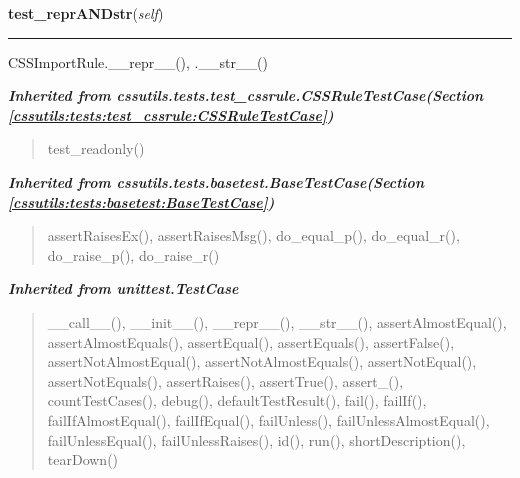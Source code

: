     \label{cssutils:tests:test_cssimportrule:CSSImportRuleTestCase:test_reprANDstr}

    \vspace{0.5ex}

\hspace{.8\funcindent}\begin{boxedminipage}{\funcwidth}

    \raggedright \textbf{test\_reprANDstr}(\textit{self})

    \vspace{-1.5ex}

    \rule{\textwidth}{0.5\fboxrule}
\setlength{\parskip}{2ex}
    CSSImportRule.\_\_repr\_\_(), .\_\_str\_\_()

\setlength{\parskip}{1ex}
    \end{boxedminipage}


\large{\textbf{\textit{Inherited from cssutils.tests.test\_cssrule.CSSRuleTestCase\textit{(Section \ref{cssutils:tests:test_cssrule:CSSRuleTestCase})}}}}

\begin{quote}
test\_readonly()
\end{quote}

\large{\textbf{\textit{Inherited from cssutils.tests.basetest.BaseTestCase\textit{(Section \ref{cssutils:tests:basetest:BaseTestCase})}}}}

\begin{quote}
assertRaisesEx(), assertRaisesMsg(), do\_equal\_p(), do\_equal\_r(), do\_raise\_p(), do\_raise\_r()
\end{quote}

\large{\textbf{\textit{Inherited from unittest.TestCase}}}

\begin{quote}
\_\_call\_\_(), \_\_init\_\_(), \_\_repr\_\_(), \_\_str\_\_(), assertAlmostEqual(), assertAlmostEquals(), assertEqual(), assertEquals(), assertFalse(), assertNotAlmostEqual(), assertNotAlmostEquals(), assertNotEqual(), assertNotEquals(), assertRaises(), assertTrue(), assert\_(), countTestCases(), debug(), defaultTestResult(), fail(), failIf(), failIfAlmostEqual(), failIfEqual(), failUnless(), failUnlessAlmostEqual(), failUnlessEqual(), failUnlessRaises(), id(), run(), shortDescription(), tearDown()
\end{quote}

